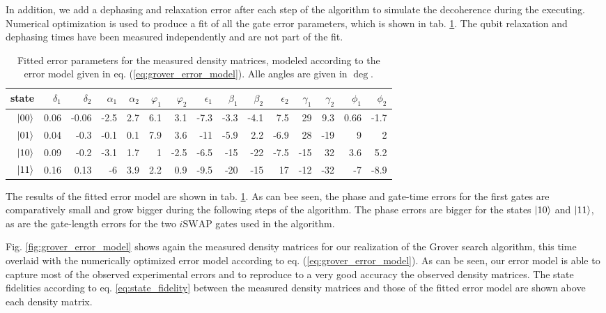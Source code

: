 In addition, we add a dephasing and relaxation error after each step of the algorithm to simulate the decoherence during the executing. Numerical optimization is used to produce a fit of all the gate error parameters, which is shown in tab. \ref{tab:grover_error_parameters}. The qubit relaxation and dephasing times have been measured independently and are not part of the fit.

\begin{table}[ht!]
\centering
\footnotesize{
\begin{tabular}{r|rrrrrrrrrrrrrr}
state & $\delta_1$ & $\delta_2$ & $\alpha_1$ & $\alpha_2$ & $\varphi_1$ & $\varphi_2$ & $\epsilon_1$ & $\beta_1$ & $\beta_2$ & $\epsilon_2$ & $\gamma_1$ & $\gamma_2$ & $\phi_1$ & $\phi_2$ \\ \hline
$\left| 00 \right>$ & 0.06 & -0.06 & -2.5 & 2.7 & 6.1 & 3.1 & -7.3 & -3.3 & -4.1 & 7.5 & 29 & 9.3 & 0.66 & -1.7
 \\
$\left| 01 \right>$ & 0.04 & -0.3 & -0.1 & 0.1 & 7.9 & 3.6 & -11 & -5.9 & 2.2 & -6.9 & 28 & -19 &  9 &  2
 \\
$\left| 10 \right>$ & 0.09 & -0.2 & -3.1 & 1.7 &  1 & -2.5 & -6.5 & -15 & -22 & -7.5 & -15 & 32 & 3.6 & 5.2
\\
$\left| 11 \right>$ & 0.16 & 0.13 & -6 & 3.9 & 2.2 & 0.9 & -9.5 & -20 & -15 & 17 & -12 & -32 & -7 & -8.9
\end{tabular}
}
\caption[Fitted gate error parameters of the Grover algorithm]{Fitted error parameters for the measured density matrices, modeled according to the error model given in eq. (\ref{eq:grover_error_model}). Alle angles are given in $\deg$.}
\label{tab:grover_error_parameters}
\end{table}

The results of the fitted error model are shown in tab. \ref{tab:grover_error_parameters}. As can bee seen, the phase and gate-time errors for the first gates are comparatively small and grow bigger during the following steps of the algorithm. The phase errors are bigger for the states $\left| 10 \right>$ and $\left| 11 \right>$, as are the gate-length errors for the two $i\mathrm{SWAP}$ gates used in the algorithm.

\smallskip

Fig. \ref{fig:grover_error_model} shows again the measured density matrices for our realization of the Grover search algorithm, this time overlaid with the numerically optimized error model according to eq. (\ref{eq:grover_error_model}). As can be seen, our error model is able to capture most of the observed experimental errors and to reproduce to a very good accuracy the observed density matrices. The state fidelities according to eq. \ref{eq:state_fidelity} between the measured density matrices and those of the fitted error model are shown above each density matrix.

